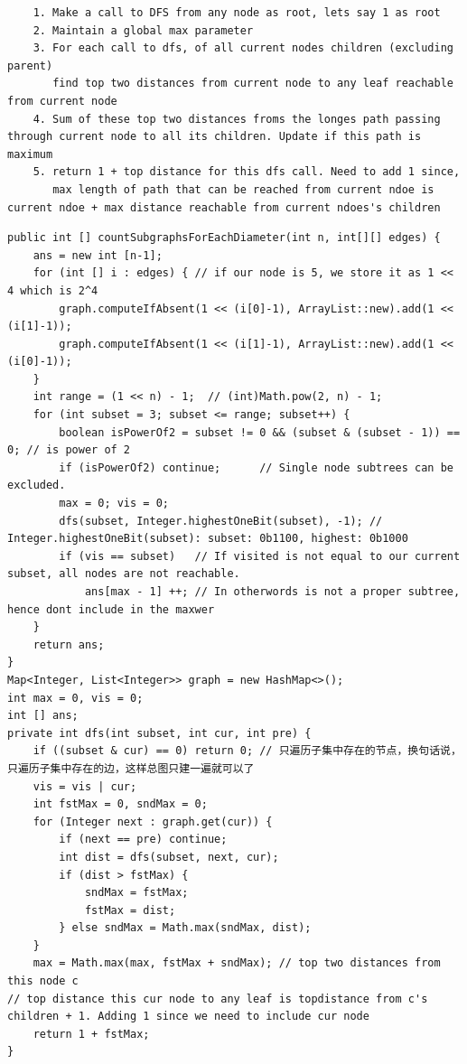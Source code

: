 \documentclass[9pt, b5paaper]{book}
\begin{document}
\begin{enumerate}
\begin{verbatim}
    1. Make a call to DFS from any node as root, lets say 1 as root
    2. Maintain a global max parameter
    3. For each call to dfs, of all current nodes children (excluding parent)
       find top two distances from current node to any leaf reachable from current node
    4. Sum of these top two distances froms the longes path passing through current node to all its children. Update if this path is maximum
    5. return 1 + top distance for this dfs call. Need to add 1 since,
       max length of path that can be reached from current ndoe is current ndoe + max distance reachable from current ndoes's children
\end{verbatim}
\begin{verbatim}
public int [] countSubgraphsForEachDiameter(int n, int[][] edges) {
    ans = new int [n-1];
    for (int [] i : edges) { // if our node is 5, we store it as 1 << 4 which is 2^4
        graph.computeIfAbsent(1 << (i[0]-1), ArrayList::new).add(1 << (i[1]-1));
        graph.computeIfAbsent(1 << (i[1]-1), ArrayList::new).add(1 << (i[0]-1));
    }
    int range = (1 << n) - 1;  // (int)Math.pow(2, n) - 1;
    for (int subset = 3; subset <= range; subset++) {
        boolean isPowerOf2 = subset != 0 && (subset & (subset - 1)) == 0; // is power of 2
        if (isPowerOf2) continue;      // Single node subtrees can be excluded.
        max = 0; vis = 0;
        dfs(subset, Integer.highestOneBit(subset), -1); // Integer.highestOneBit(subset): subset: 0b1100, highest: 0b1000
        if (vis == subset)   // If visited is not equal to our current subset, all nodes are not reachable.
            ans[max - 1] ++; // In otherwords is not a proper subtree, hence dont include in the maxwer
    }
    return ans;
}
Map<Integer, List<Integer>> graph = new HashMap<>();
int max = 0, vis = 0;
int [] ans;
private int dfs(int subset, int cur, int pre) {
    if ((subset & cur) == 0) return 0; // 只遍历子集中存在的节点，换句话说，只遍历子集中存在的边，这样总图只建一遍就可以了
    vis = vis | cur; 
    int fstMax = 0, sndMax = 0;
    for (Integer next : graph.get(cur)) {
        if (next == pre) continue;
        int dist = dfs(subset, next, cur);
        if (dist > fstMax) {
            sndMax = fstMax;
            fstMax = dist;
        } else sndMax = Math.max(sndMax, dist);
    }
    max = Math.max(max, fstMax + sndMax); // top two distances from this node c
// top distance this cur node to any leaf is topdistance from c's children + 1. Adding 1 since we need to include cur node
    return 1 + fstMax;
}
\end{verbatim}

\end{enumerate}
\end{document}
